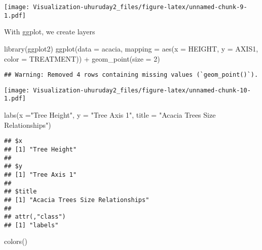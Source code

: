 \documentclass[
]{article}
\newenvironment{Shaded}{\begin{snugshade}}{\end{snugshade}}
\newcommand{\AttributeTok}[1]{\textcolor[rgb]{0.77,0.63,0.00}{#1}}
\newcommand{\DecValTok}[1]{\textcolor[rgb]{0.00,0.00,0.81}{#1}}
\newcommand{\FunctionTok}[1]{\textcolor[rgb]{0.00,0.00,0.00}{#1}}
\newcommand{\NormalTok}[1]{#1}
\newcommand{\SpecialCharTok}[1]{\textcolor[rgb]{0.00,0.00,0.00}{#1}}
\newcommand{\StringTok}[1]{\textcolor[rgb]{0.31,0.60,0.02}{#1}}
\begin{document}
\texttt{[image: Visualization-uhuruday2\_files/figure-latex/unnamed-chunk-9-1.pdf]}

With ggplot, we create layers

\begin{Shaded}
\begin{Highlighting}[]
\FunctionTok{library}\NormalTok{(ggplot2)}
\FunctionTok{ggplot}\NormalTok{(}\AttributeTok{data =}\NormalTok{ acacia, }\AttributeTok{mapping =} \FunctionTok{aes}\NormalTok{(}\AttributeTok{x =}\NormalTok{ HEIGHT, }\AttributeTok{y =}\NormalTok{ AXIS1, }\AttributeTok{color =}\NormalTok{ TREATMENT)) }\SpecialCharTok{+}
\FunctionTok{geom\_point}\NormalTok{(}\AttributeTok{size =} \DecValTok{2}\NormalTok{)}
\end{Highlighting}
\end{Shaded}

\begin{verbatim}
## Warning: Removed 4 rows containing missing values (`geom_point()`).
\end{verbatim}

\texttt{[image: Visualization-uhuruday2\_files/figure-latex/unnamed-chunk-10-1.pdf]}

\begin{Shaded}
\begin{Highlighting}[]
\FunctionTok{labs}\NormalTok{(}\AttributeTok{x =}\StringTok{"Tree Height"}\NormalTok{, }\AttributeTok{y =} \StringTok{"Tree Axis 1"}\NormalTok{, }\AttributeTok{title =} \StringTok{"Acacia Trees Size Relationships"}\NormalTok{)}
\end{Highlighting}
\end{Shaded}

\begin{verbatim}
## $x
## [1] "Tree Height"
## 
## $y
## [1] "Tree Axis 1"
## 
## $title
## [1] "Acacia Trees Size Relationships"
## 
## attr(,"class")
## [1] "labels"
\end{verbatim}

\begin{Shaded}
\begin{Highlighting}[]
\FunctionTok{colors}\NormalTok{()}
\end{Highlighting}
\end{Shaded}
\end{document}
